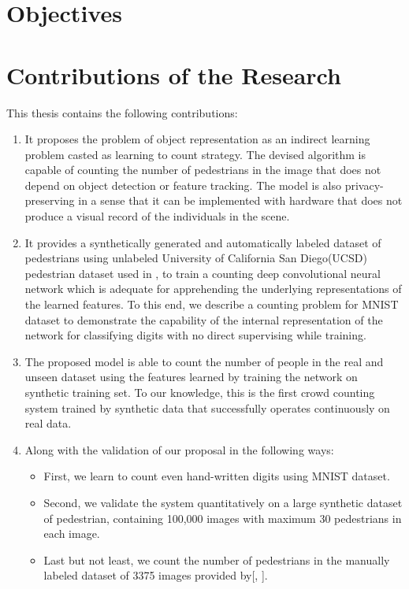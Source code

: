 \section{Objectives}
\section{Contributions of the Research}
This thesis contains the following contributions:
\begin{enumerate}
	\item It proposes the problem of object representation as an indirect learning problem casted as learning to count strategy. The devised algorithm is capable of counting the number of pedestrians in the image that does not depend on object detection or feature tracking. The model is also privacy-preserving in a sense that it can be implemented with hardware that does not produce a visual record of the individuals in the scene. 
	\item It provides a synthetically generated and automatically labeled dataset of pedestrians using unlabeled University of California San Diego(UCSD) pedestrian dataset used in \cite{mahadevan2010anomaly}, to train a counting deep convolutional neural network which is adequate for apprehending the underlying representations of the learned features. To this end, we describe a counting problem for MNIST dataset to demonstrate the capability of the internal representation of the network for classifying digits with no direct supervising while training. 
	\item The proposed model is able to count the number of people in the real and unseen dataset using the features learned by training the network on synthetic training set. To our knowledge, this is the first crowd counting system trained by synthetic data that successfully operates continuously on real data. 
	\item Along with the validation of our proposal in the following ways:
	\begin{itemize}
		\item First, we learn to count even hand-written digits using MNIST dataset. 
		\item Second, we validate the system quantitatively on a large synthetic dataset of pedestrian, containing 100,000 images with maximum 30 pedestrians in each image. 
		\item Last but not least, we count the number of pedestrians in the manually labeled dataset of 3375 images provided by[\citeauthor*{chan2013ground}, \citeyear{chan2013ground}]. 
	\end{itemize}
	
\end{enumerate}

